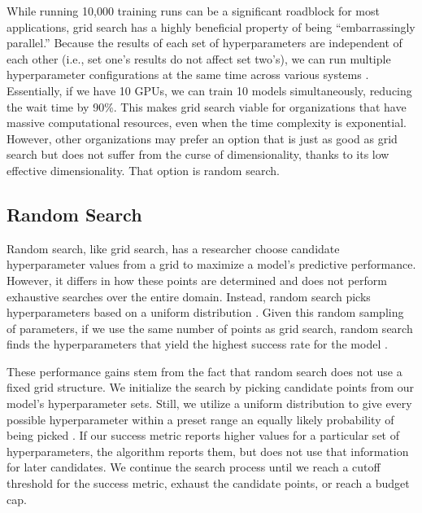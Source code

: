 \documentclass[stu,12pt,floatsintext]{apa7}
\begin{document}
While running 10,000 training runs can be a significant roadblock for most applications, grid search has a highly beneficial property of being ``embarrassingly parallel.'' Because the results of each set of hyperparameters are independent of each other (i.e., set one's results do not affect set two’s), we can run multiple hyperparameter configurations at the same time across various systems \parencite{bergstra2012random}. Essentially, if we have 10 GPUs, we can train 10 models simultaneously, reducing the wait time by 90\%. This makes grid search viable for organizations that have massive computational resources, even when the time complexity is exponential. However, other organizations may prefer an option that is just as good as grid search but does not suffer from the curse of dimensionality, thanks to its low effective dimensionality. That option is random search. 

\subsection{Random Search}

Random search, like grid search, has a researcher choose candidate hyperparameter values from a grid to maximize a model's predictive performance. However, it differs in how these points are determined and does not perform exhaustive searches over the entire domain. Instead, random search picks hyperparameters based on a uniform distribution \parencite{pilario2020kernel}. Given this random sampling of parameters, if we use the same number of points as grid search, random search finds the hyperparameters that yield the highest success rate for the model \parencite{bergstra2012random}.

These performance gains stem from the fact that random search does not use a fixed grid structure. We initialize the search by picking candidate points from our model's hyperparameter sets. Still, we utilize a uniform distribution to give every possible hyperparameter within a preset range an equally likely probability of being picked \parencite{zabinsky2009random}. If our success metric reports higher values for a particular set of hyperparameters, the algorithm reports them, but does not use that information for later candidates. We continue the search process until we reach a cutoff threshold for the success metric, exhaust the candidate points, or reach a budget cap.
\end{document}
